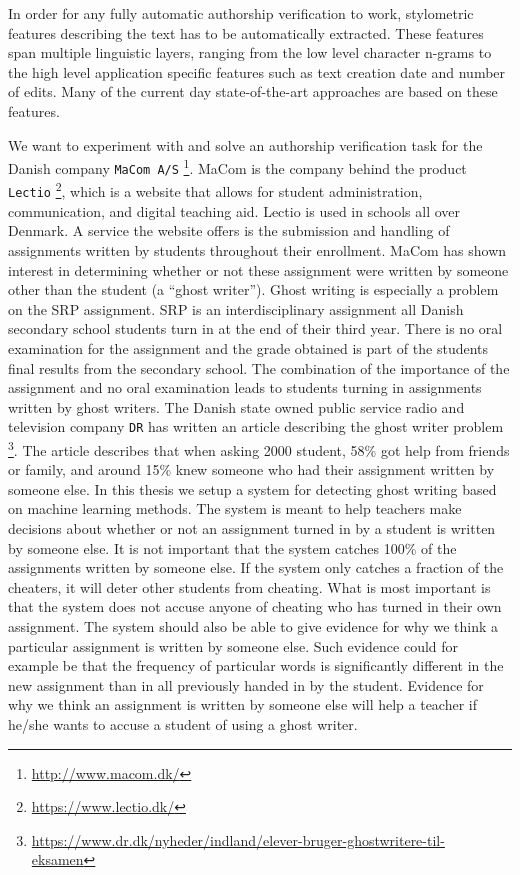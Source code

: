 In order for any fully automatic authorship verification to work, stylometric
features describing the text has to be automatically extracted. These features
span multiple linguistic layers, ranging from the low level character n-grams
to the high level application specific features such as text creation date and
number of edits. Many of the current day state-of-the-art approaches are based
on these features.


We want to experiment with and solve an authorship verification task for the
Danish company \texttt{MaCom A/S} \footnote{\url{http://www.macom.dk/}}.
MaCom is the company behind the product \texttt{Lectio}
\footnote{\url{https://www.lectio.dk/}}, which is a website that allows for
student administration, communication, and digital teaching aid. Lectio is used
in schools all over Denmark. A service the website offers is the submission
and handling of assignments written by students throughout their enrollment.
MaCom has shown interest in determining whether or not these assignment
were written by someone other than the student (a ``ghost writer''). Ghost
writing is especially a problem on the \gls{SRP} assignment. \gls{SRP} is
an interdisciplinary assignment all Danish secondary school students turn
in at the end of their third year. There is no oral examination for the
assignment and the grade obtained is part of the students final results from
the secondary school. The combination of the importance of the assignment
and no oral examination leads to students turning in assignments written by
ghost writers. The Danish state owned public service radio and television
company \texttt{DR} has written an article describing the ghost writer problem
\footnote{\url{https://www.dr.dk/nyheder/indland/elever-bruger-ghostwritere-til-
eksamen}}. The article describes that when asking 2000 student, 58\% got help
from friends or family, and around 15\% knew someone who had their assignment
written by someone else. In this thesis we setup a system for detecting ghost
writing based on machine learning methods. The system is meant to help teachers
make decisions about whether or not an assignment turned in by a student is
written by someone else. It is not important that the system catches 100\% of
the assignments written by someone else. If the system only catches a fraction
of the cheaters, it will deter other students from cheating. What is most
important is that the system does not accuse anyone of cheating who has turned
in their own assignment. The system should also be able to give evidence for why
we think a particular assignment is written by someone else. Such evidence could
for example be that the frequency of particular words is significantly different
in the new assignment than in all previously handed in by the student. Evidence
for why we think an assignment is written by someone else will help a teacher if
he/she wants to accuse a student of using a ghost writer.

